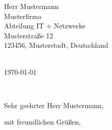 \documentclass[11pt,a4paper]{letter}
\def\opening#1{\thispagestyle{empty}
{\centering\fromaddress \vspace{0.6in} \\ %
\hspace*{\longindentation}\today\hspace*{\fill}\par} %
{\raggedright \toname \\ \toaddress \par} %
\vspace{0.4in} %
\noindent #1 %
}
\begin{document}

\begin{letter}
{Herr Mustermann\\
Musterfirma\\
Abteilung IT + Netzwerke\\
Musterstraße 12\\
123456, Musterstadt, Deutschland\\
}


\opening{Sehr geehrter Herr Mustermann,}



\closing{mit freundlichen Grüßen,}


\end{letter}
\end{document}
